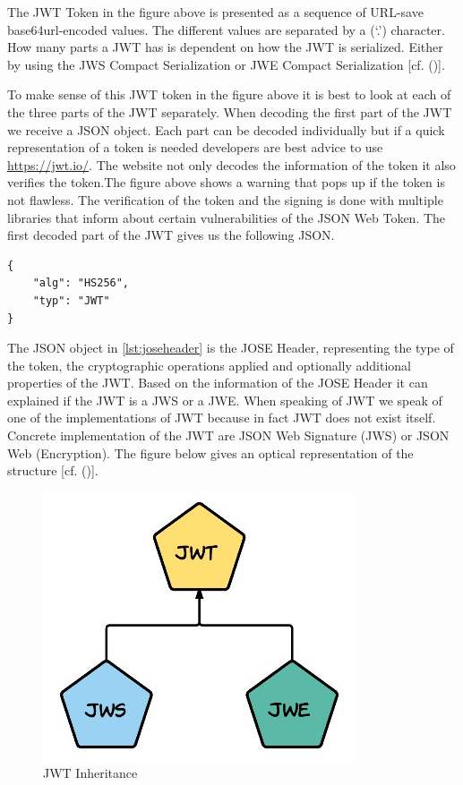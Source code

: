 {{The JWT Token in the figure above is presented as a sequence of URL-save base64url-encoded values. The different values are separated by a (‘.’) character. How many parts a JWT has is dependent on how the JWT is serialized. Either by using the JWS Compact Serialization or JWE Compact Serialization  [cf. (\cite{JWT:IETF:Jones:2015})].


To make sense of this JWT token in the figure above it is best to look at each of the three parts of the JWT separately. When decoding the first part of the JWT we receive a JSON object. Each part can be decoded individually but if a quick representation of a token is needed developers are best advice to use \href{https://jwt.io/} {https://jwt.io/}. The website not only decodes the information of the token it also verifies the token.The figure above shows a warning that pops up if the token is not flawless. The verification of the token and the signing is done with multiple libraries that inform about certain vulnerabilities of the JSON Web Token. The first decoded part of the JWT gives us the following JSON.


\begin{lstlisting}
{
	"alg": "HS256",
	"typ": "JWT"
}
\end{lstlisting}


The JSON object in \ref{lst:joseheader} is the JOSE Header, representing the type of the token, the cryptographic operations applied and optionally additional properties of the JWT. Based on the information of the JOSE Header it can explained if the JWT is a JWS or a JWE. When speaking of JWT we speak of one of the implementations of JWT because in fact JWT does not exist itself. Concrete implementation of the JWT are JSON Web Signature (JWS) or JSON Web (Encryption). The figure below gives an optical representation of the structure [cf. (\cite{Siriwardena:JWTJWSJWE:2016})].


\begin{figure}[h]
\centering
\includegraphics[width=0.6\linewidth]{images/jwtjwsjwe}
\caption[JWT Inheritence]{JWT Inheritance}
\label{fig:jwtjwsjwe}
\end{figure}

}}
